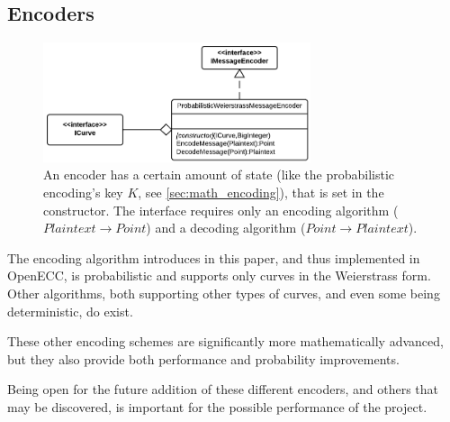 \subsection{Encoders}
\label{sec:implementation_encoding}

\begin{figure}[htb]
	\centering
	\includegraphics[width=0.7\textwidth]{implementation/encoders}
	\caption{An encoder has a certain amount of state (like the probabilistic encoding's key \(K\), see \ref{sec:math_encoding}), that is
		set in the constructor. The interface requires only an encoding algorithm (\(Plaintext \to Point\)) and
		a decoding algorithm (\(Point \to Plaintext\)).}
\end{figure}

The encoding algorithm introduces in this paper, and thus implemented in OpenECC, is probabilistic and supports
only curves in the Weierstrass form. Other algorithms, both supporting other types of curves, and even some being
deterministic, do exist.

These other encoding schemes are significantly more mathematically advanced, but they also provide both performance
and probability improvements.\cite{MappingAMessage}

Being open for the future addition of these different encoders, and others that may be discovered, is important
for the possible performance of the project.